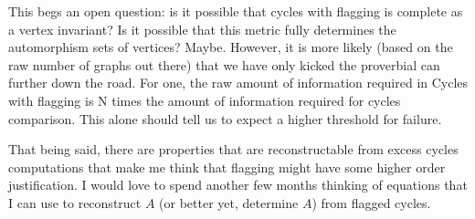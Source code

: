 This begs an open question: is it possible that cycles with flagging is complete as a vertex invariant?
Is it possible that this metric fully determines the automorphism sets of vertices? Maybe.
However, it is more likely (based on the raw number of graphs out there) that we have only kicked the proverbial can further down the road.
For one, the raw amount of information required in Cycles with flagging is N times the amount of information required for cycles comparison.
This alone should tell us to expect a higher threshold for failure.

That being said, there are properties that are reconstructable from excess cycles computations that make me think that flagging might have some higher order justification.
I would love to spend another few months thinking of equations that I can use to reconstruct $A$ (or better yet, determine $A$) from flagged cycles.

